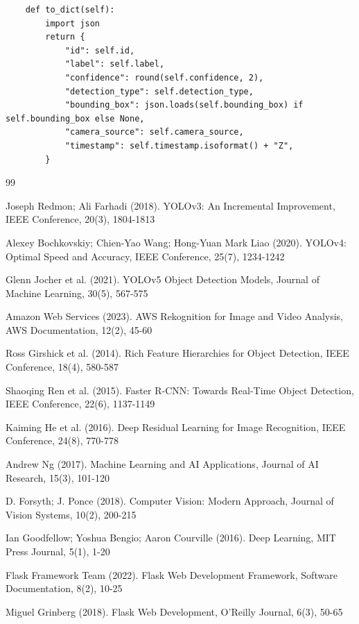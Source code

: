 \documentclass[10pt,openany]{report}
\begin{document}
\begin{sloppypar}
{{{\begin{sloppypar}
\begin{lstlisting}
    def to_dict(self):
        import json
        return {
            "id": self.id,
            "label": self.label,
            "confidence": round(self.confidence, 2),
            "detection_type": self.detection_type,
            "bounding_box": json.loads(self.bounding_box) if self.bounding_box else None,
            "camera_source": self.camera_source,
            "timestamp": self.timestamp.isoformat() + "Z",
        }
\end{lstlisting}


\renewcommand\bibname{References}


\begin{thebibliography}{99}

\bibitem{} Joseph Redmon; Ali Farhadi (2018). YOLOv3: An Incremental Improvement, IEEE Conference, 20(3), 1804-1813

\bibitem{} Alexey Bochkovskiy; Chien-Yao Wang; Hong-Yuan Mark Liao (2020). YOLOv4: Optimal Speed and Accuracy, IEEE Conference, 25(7), 1234-1242

\bibitem{} Glenn Jocher et al. (2021). YOLOv5 Object Detection Models, Journal of Machine Learning, 30(5), 567-575

\bibitem{} Amazon Web Services (2023). AWS Rekognition for Image and Video Analysis, AWS Documentation, 12(2), 45-60

\bibitem{} Ross Girshick et al. (2014). Rich Feature Hierarchies for Object Detection, IEEE Conference, 18(4), 580-587

\bibitem{} Shaoqing Ren et al. (2015). Faster R-CNN: Towards Real-Time Object Detection, IEEE Conference, 22(6), 1137-1149

\bibitem{} Kaiming He et al. (2016). Deep Residual Learning for Image Recognition, IEEE Conference, 24(8), 770-778

\bibitem{} Andrew Ng (2017). Machine Learning and AI Applications, Journal of AI Research, 15(3), 101-120

\bibitem{} D. Forsyth; J. Ponce (2018). Computer Vision: Modern Approach, Journal of Vision Systems, 10(2), 200-215

\bibitem{} Ian Goodfellow; Yoshua Bengio; Aaron Courville (2016). Deep Learning, MIT Press Journal, 5(1), 1-20

\bibitem{} Flask Framework Team (2022). Flask Web Development Framework, Software Documentation, 8(2), 10-25

\bibitem{} Miguel Grinberg (2018). Flask Web Development, O'Reilly Journal, 6(3), 50-65


\end{thebibliography}
\end{sloppypar}}}}
\end{sloppypar}
\end{document}
